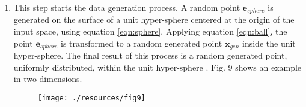 \documentclass[parskip=full]{scrartcl}
\begin{document}
\begin{enumerate}
	\item This step starts the data generation process. A random point \(
	\textbf{e}_{sphere} \) is generated on the surface of a unit hyper-sphere
	centered at the origin of the input space, using equation
	\eqref{eqn:sphere}. Applying equation \eqref{eqn:ball}, the point \(
	\textbf{e}_{sphere} \) is transformed to a random generated point \(
	\textbf{x}_{gen} \) inside the unit hyper-sphere. The final result of this
	process is a random generated point, uniformly distributed, within the unit
	hyper-sphere \cite{DasGupta2011}. Fig. 9 shows an example in two dimensions.

	\begin{figure}[H]
		\centering
		\texttt{[image: ./resources/fig9]}
	\end{figure}


\end{enumerate}
\end{document}
